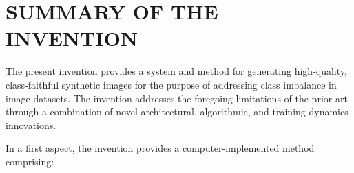 \documentclass[12pt,letterpaper]{article}
\begin{document}
\section*{SUMMARY OF THE INVENTION}

The present invention provides a system and method for generating
high-quality, class-faithful synthetic images for the purpose of addressing
class imbalance in image datasets.  The invention addresses the foregoing
limitations of the prior art through a combination of novel architectural,
algorithmic, and training-dynamics innovations.

In a first aspect, the invention provides a computer-implemented method
comprising:
\end{document}
